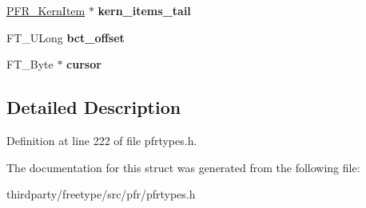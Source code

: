 \begin{DoxyCompactItemize}
\item 
\mbox{\label{struct_p_f_r___phy_font_rec___a1b6dddc77624a3f1263152d24651bf09}} 
\hyperlink{struct_p_f_r___kern_item_rec__}{P\+F\+R\+\_\+\+Kern\+Item} $\ast$ {\bfseries kern\+\_\+items\+\_\+tail}
\item 
\mbox{\label{struct_p_f_r___phy_font_rec___aab15ed917a49e40603b3c71d4a3e4150}} 
F\+T\+\_\+\+U\+Long {\bfseries bct\+\_\+offset}
\item 
\mbox{\label{struct_p_f_r___phy_font_rec___ae0b734f5e8b401801594078478c6b83c}} 
F\+T\+\_\+\+Byte $\ast$ {\bfseries cursor}
\end{DoxyCompactItemize}


\subsection{Detailed Description}


Definition at line 222 of file pfrtypes.\+h.



The documentation for this struct was generated from the following file\+:\begin{DoxyCompactItemize}
\item 
thirdparty/freetype/src/pfr/pfrtypes.\+h\end{DoxyCompactItemize}
